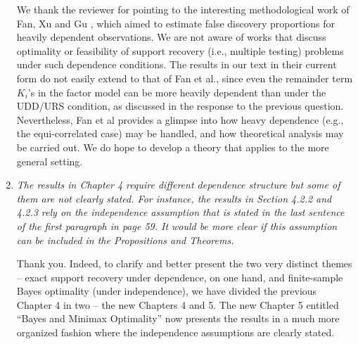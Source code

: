 \documentclass[11pt]{article}
\begin{document}
\begin{enumerate}
    We thank the reviewer for pointing to the interesting methodological work of Fan, Xu and Gu \cite{fan:xu:gu:2012}, which aimed to estimate false discovery proportions for heavily dependent observations. 
    We are not aware of works that discuss optimality or feasibility of support recovery (i.e., multiple testing) problems under such dependence conditions.
    The results in our text in their current form do not easily extend to that of Fan et al., since even the remainder term $K_i$'s in the factor model can be more heavily dependent than under the UDD/URS condition, as discussed in the response to the previous question.
    Nevertheless, Fan et al provides a glimpse into how heavy dependence (e.g., the equi-correlated case) may be handled, and how theoretical analysis may be carried out. We do hope to develop a theory that applies to the more general setting.
    
   
    \item  {\em The results in Chapter 4 require different dependence structure but some of them are not clearly stated. For instance, the results in Section 4.2.2 and 4.2.3 rely on the independence assumption that is stated in the last sentence of the first paragraph in page 59. It would be more clear if this assumption can be included in the Propositions and Theorems.}
    
    Thank you.  Indeed, to clarify and better present the two very distinct themes -- exact support recovery under dependence, on one hand, and 
    finite-sample Bayes optimality (under independence), we have divided the previous Chapter 4 in two -- the new Chapters 4 and 5. The new
    Chapter 5 entitled ``Bayes and Minimax Optimality'' now presents the results in a much more organized fashion where the independence 
    assumptions are clearly stated. 
    

\end{enumerate}
\end{document}
